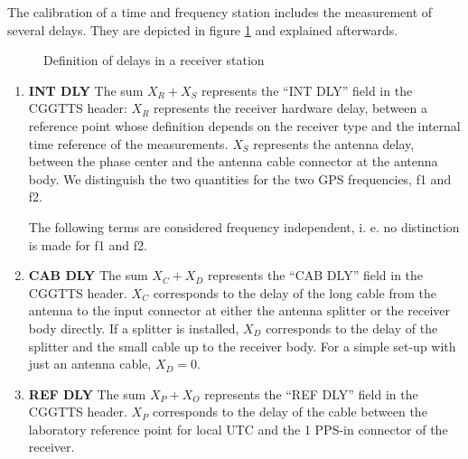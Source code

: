 \documentclass[11pt]{article}
\begin{document}
The calibration of a time and frequency station includes the measurement of several delays. They are depicted in figure \ref{fig:delays} and explained afterwards.

\begin{figure}[ht]
\begin{center}
\fbox{}
\caption{Definition of delays in a receiver station}
\label{fig:delays}
\end{center}
\end{figure}



\begin{enumerate}
    \item \textbf{INT DLY} The sum $X_R + X_S$ represents the “INT DLY” field in the CGGTTS header:
$X_R$ represents the receiver hardware delay, between a reference point whose definition depends on the receiver type and the internal time reference of the measurements. $X_S$ represents the antenna delay, between the phase center and the antenna cable connector at the antenna body. We distinguish the two quantities for the two GPS frequencies, f1 and f2. %

The following terms are considered frequency independent, i. e. no distinction is made for f1 and f2.

\item \textbf{CAB DLY}
The sum $X_C + X_D$ represents the “CAB DLY” field in the CGGTTS header.
$X_C$ corresponds to the delay of the long cable from the antenna to the input connector at either the antenna splitter or the receiver body directly. If a splitter is installed, $X_D$ corresponds to the delay of the splitter and the small cable up to the receiver body. For a simple set-up with just an 
antenna cable, $X_D = 0$.

\item \textbf{REF DLY}
The sum $X_P + X_O$ represents the “REF DLY” field in the CGGTTS header. $X_P$ corresponds to the delay of the cable between the laboratory reference point for local UTC and the 1 PPS-in connector of the receiver. 

\end{enumerate}
\end{document}
